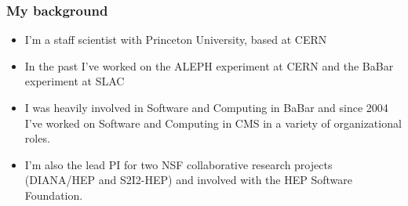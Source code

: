 \begin{frame}
\frametitle{My background}

\begin{itemize}
\item I'm a staff scientist with Princeton University, based at CERN
\item In the past I've worked on the ALEPH experiment at CERN and the BaBar experiment at SLAC
\item I was heavily involved in Software and Computing in BaBar and since 2004 I've worked on Software and Computing in CMS in a variety of organizational roles. 
\item I'm also the lead PI for two NSF collaborative research projects (DIANA/HEP and S2I2-HEP) and involved with the HEP Software Foundation.
\end{itemize}

\end{frame}


